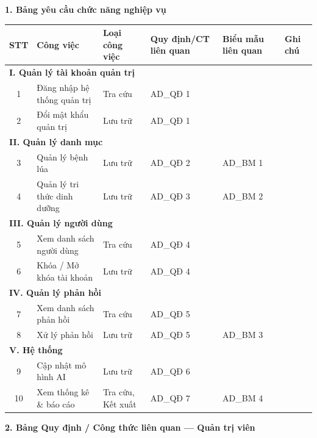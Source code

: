 \documentclass[12pt,a4paper]{article}
\begin{document}
\vspace{0.3cm}
\textbf{1. Bảng yêu cầu chức năng nghiệp vụ}

\begin{longtable}{|c|p{3cm}|p{2cm}|p{2.5cm}|p{2cm}|p{2.5cm}|}
\hline
\rowcolor{headerblue}
\textbf{STT} & \textbf{Công việc} & \textbf{Loại công việc} & \textbf{Quy định/CT liên quan} & \textbf{Biểu mẫu liên quan} & \textbf{Ghi chú} \\
\hline
\endhead
\multicolumn{6}{|l|}{\cellcolor{notegreen}\textbf{I. Quản lý tài khoản quản trị}} \\
\hline
1 & Đăng nhập hệ thống quản trị & Tra cứu & AD\_QĐ 1 & & \\
\hline
2 & Đổi mật khẩu quản trị & Lưu trữ & AD\_QĐ 1 & & \\
\hline
\multicolumn{6}{|l|}{\cellcolor{notegreen}\textbf{II. Quản lý danh mục}} \\
\hline
3 & Quản lý bệnh lúa & Lưu trữ & AD\_QĐ 2 & AD\_BM 1 & \\
\hline
4 & Quản lý tri thức dinh dưỡng & Lưu trữ & AD\_QĐ 3 & AD\_BM 2 & \\
\hline
\multicolumn{6}{|l|}{\cellcolor{notegreen}\textbf{III. Quản lý người dùng}} \\
\hline
5 & Xem danh sách người dùng & Tra cứu & AD\_QĐ 4 & & \\
\hline
6 & Khóa / Mở khóa tài khoản & Lưu trữ & AD\_QĐ 4 & & \\
\hline
\multicolumn{6}{|l|}{\cellcolor{notegreen}\textbf{IV. Quản lý phản hồi}} \\
\hline
7 & Xem danh sách phản hồi & Tra cứu & AD\_QĐ 5 & & \\
\hline
8 & Xử lý phản hồi & Lưu trữ & AD\_QĐ 5 & AD\_BM 3 & \\
\hline
\multicolumn{6}{|l|}{\cellcolor{notegreen}\textbf{V. Hệ thống}} \\
\hline
9 & Cập nhật mô hình AI & Lưu trữ & AD\_QĐ 6 & & \\
\hline
10 & Xem thống kê \& báo cáo & Tra cứu, Kết xuất & AD\_QĐ 7 & AD\_BM 4 & \\
\hline
\end{longtable}

\vspace{0.3cm}
\textbf{2. Bảng Quy định / Công thức liên quan --- Quản trị viên}
\end{document}
